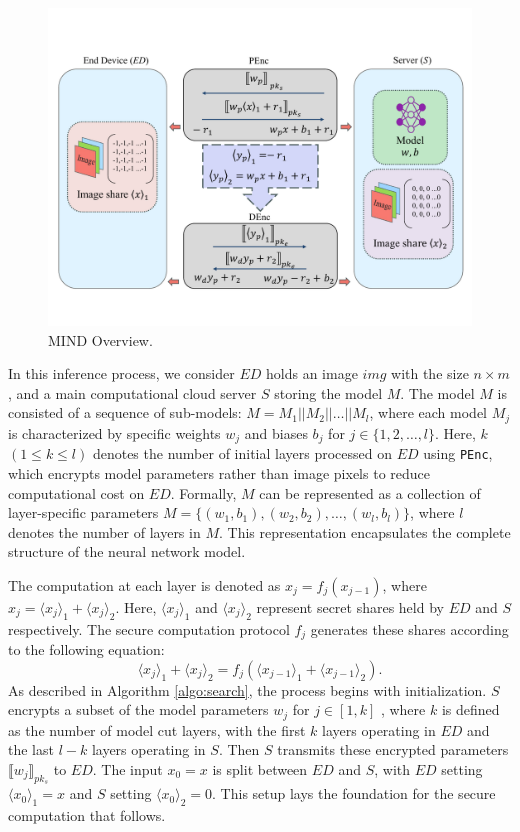 \documentclass[conference]{IEEEtran}
\newcommand{\PEnc}{\texttt{PEnc}}
\begin{document}
\begin{figure}[ht]
\centering
\includegraphics[scale=0.6]{fig3.pdf}
\caption{MIND Overview.} \label{fig:MIND Overview}
\end{figure}
In this inference process, we consider $ED$ holds an image $img$ with the size $n\times m$, and a main computational cloud server $S$ storing the model $M$. The model $M$ is consisted of a sequence of sub-models: $M=M_1 || M_2 || \dots || M_l$, where each model $M_j$ is characterized by specific weights $w_{j}$ and biases $b_{j}$ for $j \in \{1, 2, \dots, l\}$. Here, $k$ $(1 \leq k \leq l)$ denotes the number of initial layers processed on $ED$ using \PEnc, which encrypts model parameters rather than image pixels to reduce computational cost on $ED$. Formally, $M$ can be represented as a collection of layer-specific parameters $M=\{(w_{1},b_{1}),(w_{2},b_{2}),\dots,(w_{l},b_{l})\}$, where $l$ denotes the number of layers in $M$. This representation encapsulates the complete structure of the neural network model.

The computation at each layer is denoted as $x_j = f_j(x_{j-1})$, where $x_j=\langle x_j \rangle_1 + \langle x_j \rangle_2$. Here, $\langle x_j \rangle_1$ and $\langle x_j \rangle_2$ represent secret shares held by $ED$ and $S$ respectively. The secure computation protocol $f_j$ generates these shares according to the following equation:
\begin{equation}
    \langle x_j \rangle_1+\langle x_j \rangle_2 = f_j(\langle x_{j-1} \rangle_1 + \langle x_{j-1} \rangle_2).
\end{equation}
As described in Algorithm \ref{algo:search}, the process begins with initialization. $S$ encrypts a subset of the model parameters $w_j$ for $j \in [1,k]$ , where $k$ is defined as the number of model cut layers, with the first $k$ layers operating in $ED$ and the last $l-k$ layers operating in $S$. Then $S$ transmits these encrypted parameters $\llbracket w_j \rrbracket_{pk_s}$ to $ED$. The input $x_0=x$ is split between $ED$ and $S$, with $ED$ setting $\langle x_0\rangle_1=x$ and $S$ setting $\langle x_0\rangle_2=0$. This setup lays the foundation for the secure computation that follows.
\end{document}
